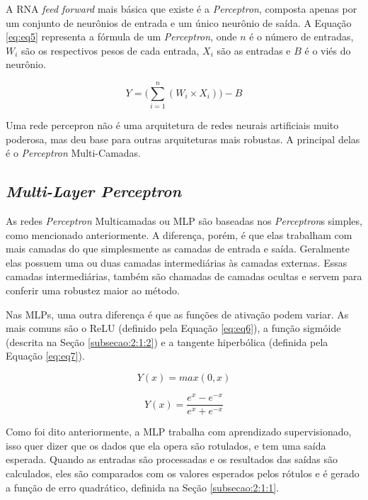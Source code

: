 A \ac{RNA} \textit{feed forward} mais básica que existe é a \textit{Perceptron}, composta apenas por um conjunto de neurônios de entrada e um único neurônio de saída. A Equação  \ref{eq:eq5} representa a fórmula de um \textit{Perceptron}, onde $n$ é o número de entradas, $W_i$ são os respectivos pesos de cada entrada, $X_i$ são as entradas e $B$ é o viés do neurônio.

\begin{equation}
Y=\Big(\sum_{i=1}^{n}{(W_i \times X_i)}\Big) - B
\label{eq:eq5}
\end{equation}

Uma rede percepron não é uma arquitetura de redes neurais artificiais muito poderosa, mas deu base para outras arquiteturas mais robustas. A principal delas é o \textit{Perceptron} Multi-Camadas.

\subsection{\textit{Multi-Layer Perceptron}}
\label{subsecao:2:2:1}


As redes \textit{Perceptron} Multicamadas ou \ac{MLP} são baseadas nos \textit{Perceptron}s simples, como mencionado anteriormente. A diferença, porém, é que elas trabalham com mais camadas do que simplesmente as camadas de entrada e saída. Geralmente elas possuem uma ou duas camadas intermediárias às camadas externas. Essas camadas intermediárias, também são chamadas de camadas ocultas e servem para conferir uma robustez maior ao método.

Nas \ac{MLP}s, uma outra diferença é que as funções de ativação podem variar. As mais comuns são o \ac{ReLU} (definido pela Equação  \ref{eq:eq6}), a função sigmóide (descrita na Seção \ref{subsecao:2:1:2}) e a tangente hiperbólica (definida pela Equação  \ref{eq:eq7}).

\begin{equation}
	Y(x) = max(0, x)
	\label{eq:eq6}
\end{equation}

\begin{equation}
	Y(x) = \dfrac{e^x - e^{-x}}{e^x+e^{-x}}
	\label{eq:eq7}
\end{equation}

Como foi dito anteriormente, a \ac{MLP} trabalha com aprendizado supervisionado, isso quer dizer que os dados que ela opera são rotulados, e tem uma saída esperada. Quando as entradas são processadas e os resultados das saídas são calculados, eles são comparados com os valores esperados pelos rótulos e é gerado a função de erro quadrático, definida na Seção \ref{subsecao:2:1:1}.

